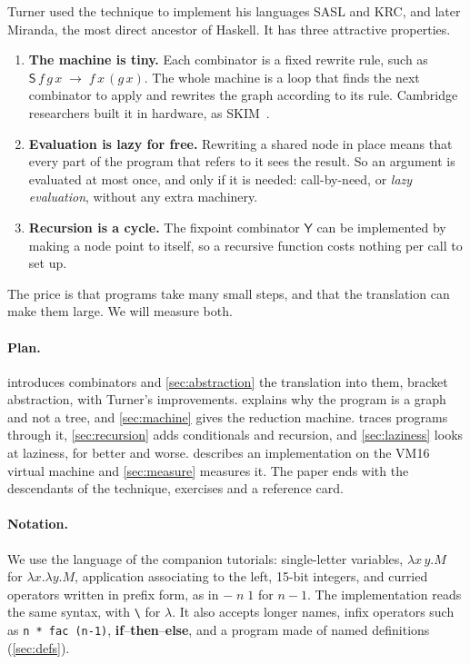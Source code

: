 \documentclass[11pt,a4paper]{article}
\newcommand{\cmb}[1]{\textsf{#1}}
\newcommand{\Sc}{\cmb{S}}
\newcommand{\Y}{\cmb{Y}}
\newcommand{\red}{\;\to\;}
\theoremstyle{definition}
\theoremstyle{plain}
\begin{document}
Turner used the technique to implement his languages SASL and KRC, and later
Miranda, the most direct ancestor of Haskell. It has three attractive
properties.

\begin{enumerate}[itemsep=2pt]
\item \textbf{The machine is tiny.} Each combinator is a fixed rewrite rule,
  such as $\Sc\,f\,g\,x \red f\,x\,(g\,x)$. The whole machine is a loop that
  finds the next combinator to apply and rewrites the graph according to its
  rule. Cambridge researchers built it in hardware, as SKIM~\cite{skim80}.
\item \textbf{Evaluation is lazy for free.} Rewriting a shared node in place
  means that every part of the program that refers to it sees the result.
  So an argument is evaluated at most once, and only if it is needed:
  call-by-need, or \emph{lazy evaluation}, without any extra machinery.
\item \textbf{Recursion is a cycle.} The fixpoint combinator $\Y$ can be
  implemented by making a node point to itself, so a recursive function
  costs nothing per call to set up.
\end{enumerate}

The price is that programs take many small steps, and that the translation
can make them large. We will measure both.

\paragraph{Plan.}  introduces combinators and
\cref{sec:abstraction} the translation into them, bracket abstraction, with
Turner's improvements.  explains why the program is a graph
and not a tree, and \cref{sec:machine} gives the reduction machine.
 traces programs through it, \cref{sec:recursion} adds
conditionals and recursion, and \cref{sec:laziness} looks at laziness, for
better and worse.  describes an implementation on the VM16
virtual machine and \cref{sec:measure} measures it. The paper ends with the
descendants of the technique, exercises and a reference card.

\paragraph{Notation.} We use the language of the companion tutorials:
single-letter variables, $\lambda x\,y.M$ for $\lambda x.\lambda y.M$,
application associating to the left, 15-bit integers, and curried operators
written in prefix form, as in ${-}\;n\;1$ for $n-1$. The implementation reads
the same syntax, with \verb|\| for $\lambda$. It also accepts longer names,
infix operators such as \texttt{n * fac (n-1)}, \textbf{if}--\textbf{then}--\textbf{else},
and a program made of named definitions (\cref{sec:defs}).
\end{document}
